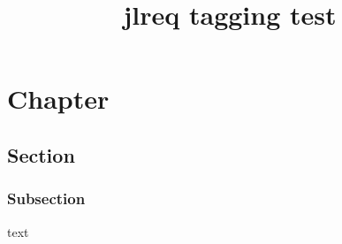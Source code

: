 \documentclass[report]{jlreq}
\title{jlreq tagging test}
\begin{document}
\tableofcontents %

\chapter{Chapter} %
\section{Section} %
\subsection{Subsection} %
text
\end{document}
